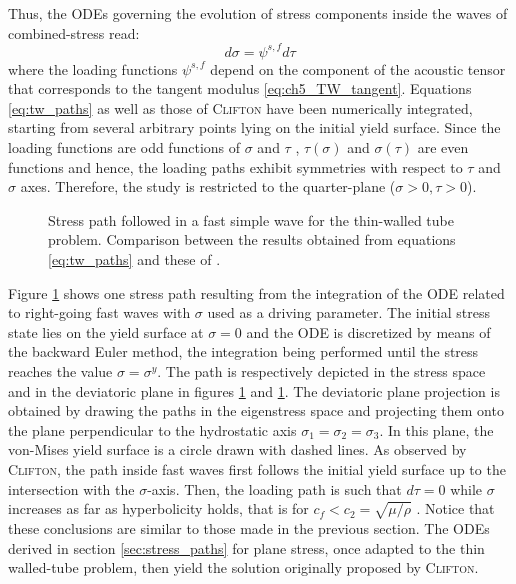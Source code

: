 Thus, the ODEs governing the evolution of stress components inside the waves of combined-stress read: 
\begin{equation}
  \label{eq:tw_paths}
  d\sigma = \psi^{s,f} d\tau
\end{equation}
where the loading functions $\psi^{s,f}$ depend on the component of the acoustic tensor that corresponds to the tangent modulus \eqref{eq:ch5_TW_tangent}.
Equations \eqref{eq:tw_paths} as well as those of \textsc{Clifton} \cite{Clifton} have been numerically integrated, starting from several arbitrary points lying on the initial yield surface.
Since the loading functions are odd functions of $\sigma$ and $\tau$ \cite{Clifton}, $\tau(\sigma)$ and $\sigma(\tau)$ are even functions and hence, the loading paths exhibit symmetries with respect to $\tau$ and $\sigma$ axes.
Therefore, the study is restricted to the quarter-plane ($\sigma>0,\tau>0$).
\begin{figure}[h!]
  \centering
   \qquad
  \caption{Stress path followed in a fast simple wave for the thin-walled tube problem. Comparison between the results obtained from equations \eqref{eq:tw_paths} and these of \cite{Clifton}.}
  \label{fig:fast_clifton}
\end{figure}
Figure \ref{fig:fast_clifton} shows one stress path resulting from the integration of the ODE related to right-going fast waves with $\sigma$ used as a driving parameter.
The initial stress state lies on the yield surface at $\sigma=0$ and the ODE is discretized by means of the backward Euler method, the integration being performed until the stress reaches the value $\sigma=\sigma^y $.
The path is respectively depicted in the stress space and in the deviatoric plane in figures \ref{fig:fast_clifton} and \ref{fig:fast_clifton}.
The deviatoric plane projection is obtained by drawing the paths in the eigenstress space and projecting them onto the plane perpendicular to the hydrostatic axis $\sigma_1=\sigma_2=\sigma_3$.
In this plane, the von-Mises yield surface is a circle drawn with dashed lines.
As observed by \textsc{Clifton}, the path inside fast waves first follows the initial yield surface up to the intersection with the $\sigma$-axis.
Then, the loading path is such that $d\tau=0$ while $\sigma$ increases as far as hyperbolicity holds, that is for $c_f < c_2 = \sqrt{\mu/\rho} $ \cite{Clifton}.
Notice that these conclusions are similar to those made in the previous section.
The ODEs derived in section \ref{sec:stress_paths} for plane stress, once adapted to the thin walled-tube problem, then yield the solution originally proposed by \textsc{Clifton}.

